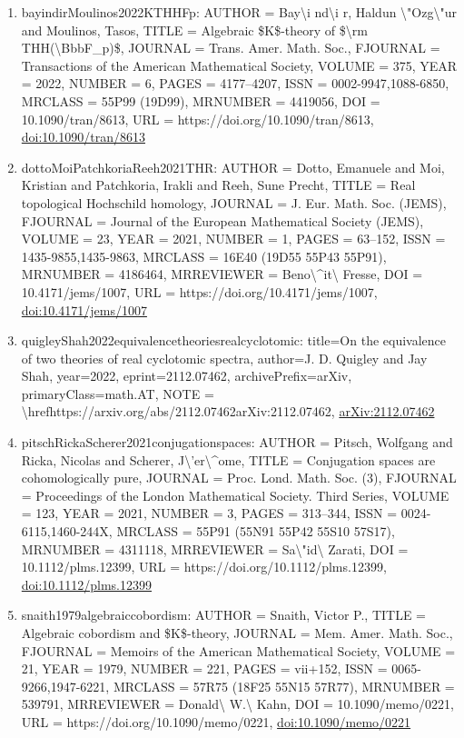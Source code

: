 \documentclass[11pt]{article}
\begin{document}
\begin{enumerate}[leftmargin=*]
  \item bayindirMoulinos2022KTHHFp: AUTHOR = Bay\textbackslash{}i nd\textbackslash{}i r, Haldun \textbackslash{}"Ozg\textbackslash{}"ur and Moulinos, Tasos, TITLE = Algebraic \$K\$-theory of \$\textbackslash{}rm THH(\textbackslash{}BbbF\_p)\$, JOURNAL = Trans. Amer. Math. Soc., FJOURNAL = Transactions of the American Mathematical Society, VOLUME = 375, YEAR = 2022, NUMBER = 6, PAGES = 4177--4207, ISSN = 0002-9947,1088-6850, MRCLASS = 55P99 (19D99), MRNUMBER = 4419056, DOI = 10.1090/tran/8613, URL = https://doi.org/10.1090/tran/8613, \href{https://doi.org/10.1090/tran/8613}{doi:10.1090/tran/8613}
  \item dottoMoiPatchkoriaReeh2021THR: AUTHOR = Dotto, Emanuele and Moi, Kristian and Patchkoria, Irakli and Reeh, Sune Precht, TITLE = Real topological Hochschild homology, JOURNAL = J. Eur. Math. Soc. (JEMS), FJOURNAL = Journal of the European Mathematical Society (JEMS), VOLUME = 23, YEAR = 2021, NUMBER = 1, PAGES = 63--152, ISSN = 1435-9855,1435-9863, MRCLASS = 16E40 (19D55 55P43 55P91), MRNUMBER = 4186464, MRREVIEWER = Beno\textbackslash{}\^{}it\textbackslash{} Fresse, DOI = 10.4171/jems/1007, URL = https://doi.org/10.4171/jems/1007, \href{https://doi.org/10.4171/jems/1007}{doi:10.4171/jems/1007}
  \item quigleyShah2022equivalencetheoriesrealcyclotomic: title=On the equivalence of two theories of real cyclotomic spectra, author=J. D. Quigley and Jay Shah, year=2022, eprint=2112.07462, archivePrefix=arXiv, primaryClass=math.AT, NOTE = \textbackslash{}hrefhttps://arxiv.org/abs/2112.07462arXiv:2112.07462, \href{https://arxiv.org/abs/2112.07462}{arXiv:2112.07462}
  \item pitschRickaScherer2021conjugationspaces: AUTHOR = Pitsch, Wolfgang and Ricka, Nicolas and Scherer, J\textbackslash{}'er\textbackslash{}\^{}ome, TITLE = Conjugation spaces are cohomologically pure, JOURNAL = Proc. Lond. Math. Soc. (3), FJOURNAL = Proceedings of the London Mathematical Society. Third Series, VOLUME = 123, YEAR = 2021, NUMBER = 3, PAGES = 313--344, ISSN = 0024-6115,1460-244X, MRCLASS = 55P91 (55N91 55P42 55S10 57S17), MRNUMBER = 4311118, MRREVIEWER = Sa\textbackslash{}"id\textbackslash{} Zarati, DOI = 10.1112/plms.12399, URL = https://doi.org/10.1112/plms.12399, \href{https://doi.org/10.1112/plms.12399}{doi:10.1112/plms.12399}
  \item snaith1979algebraiccobordism: AUTHOR = Snaith, Victor P., TITLE = Algebraic cobordism and \$K\$-theory, JOURNAL = Mem. Amer. Math. Soc., FJOURNAL = Memoirs of the American Mathematical Society, VOLUME = 21, YEAR = 1979, NUMBER = 221, PAGES = vii+152, ISSN = 0065-9266,1947-6221, MRCLASS = 57R75 (18F25 55N15 57R77), MRNUMBER = 539791, MRREVIEWER = Donald\textbackslash{} W.\textbackslash{} Kahn, DOI = 10.1090/memo/0221, URL = https://doi.org/10.1090/memo/0221, \href{https://doi.org/10.1090/memo/0221}{doi:10.1090/memo/0221}

\end{enumerate}
\end{document}
